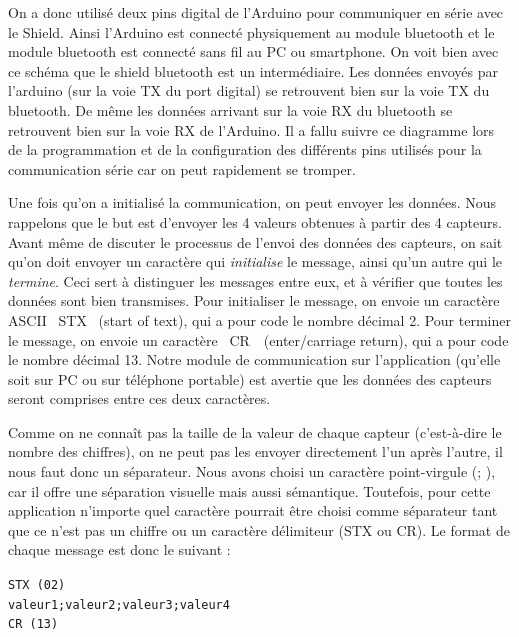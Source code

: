 \documentclass{polytech/polytech}
\begin{document}
On a donc utilisé deux pins digital de l'Arduino pour communiquer en série avec le Shield. 
Ainsi l'Arduino est connecté physiquement au module bluetooth et le module bluetooth est connecté sans fil au PC ou smartphone. 
On voit bien avec ce schéma que le shield bluetooth est un intermédiaire. 
Les données envoyés par l'arduino (sur la voie TX du port digital) se retrouvent bien sur la voie TX du bluetooth.
 De même les données arrivant sur la voie RX du bluetooth se retrouvent bien sur la voie RX de l'Arduino.
  Il a fallu suivre ce diagramme lors de la programmation et de la configuration des différents pins utilisés pour la communication série car on peut rapidement se tromper.

Une fois qu'on a initialisé la communication, on peut envoyer les données. Nous rappelons que le but est d’envoyer les 4 valeurs obtenues à partir des 4 capteurs. Avant même de discuter le processus de l'envoi des données des capteurs, on sait qu'on doit envoyer un caractère qui \textit{initialise} le message, ainsi qu'un autre qui le \textit{termine}. Ceci sert à distinguer les messages entre eux, et à vérifier que toutes les données sont bien transmises. Pour initialiser le message, on envoie un caractère ASCII \guillemotleft ~STX \guillemotright\ (start of text), qui a pour code le nombre décimal 2. Pour terminer le message, on envoie un caractère \guillemotleft\ CR~\guillemotright\ (enter/carriage return), qui a pour code le nombre décimal 13. Notre module de communication sur l'application (qu'elle soit sur PC ou sur téléphone portable) est avertie que les données des capteurs seront comprises entre ces deux caractères.

Comme on ne connaît pas la taille de la valeur de chaque capteur (c'est-à-dire le nombre des chiffres), on ne peut pas les envoyer directement l'un après l'autre, il nous faut donc un séparateur.
Nous avons choisi un caractère point-virgule (\guillemotleft ; \guillemotright), car il offre une séparation visuelle mais aussi sémantique. Toutefois, pour cette application n'importe quel caractère pourrait être choisi comme séparateur tant que ce n'est pas un chiffre ou un caractère délimiteur (STX ou CR). Le format de chaque message est donc le suivant :

\begin{center}
\texttt{STX (02)}\\
\texttt{valeur1;valeur2;valeur3;valeur4}\\
\texttt{CR (13)}
\end{center}
\end{document}
